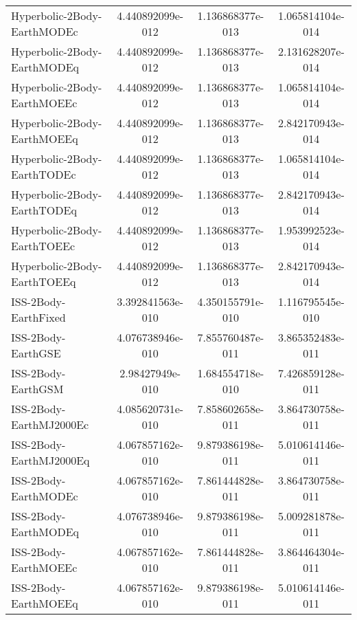 \begin{table}[htbp!]
\begin{tabular}{lccc}
         Hyperbolic-2Body-EarthMODEc & 4.440892099e-012 & 1.136868377e-013 & 1.065814104e-014 \\
         Hyperbolic-2Body-EarthMODEq & 4.440892099e-012 & 1.136868377e-013 & 2.131628207e-014 \\
         Hyperbolic-2Body-EarthMOEEc & 4.440892099e-012 & 1.136868377e-013 & 1.065814104e-014 \\
         Hyperbolic-2Body-EarthMOEEq & 4.440892099e-012 & 1.136868377e-013 & 2.842170943e-014 \\
         Hyperbolic-2Body-EarthTODEc & 4.440892099e-012 & 1.136868377e-013 & 1.065814104e-014 \\
         Hyperbolic-2Body-EarthTODEq & 4.440892099e-012 & 1.136868377e-013 & 2.842170943e-014 \\
         Hyperbolic-2Body-EarthTOEEc & 4.440892099e-012 & 1.136868377e-013 & 1.953992523e-014 \\
         Hyperbolic-2Body-EarthTOEEq & 4.440892099e-012 & 1.136868377e-013 & 2.842170943e-014 \\
         ISS-2Body-EarthFixed & 3.392841563e-010 & 4.350155791e-010 & 1.116795545e-010 \\
         ISS-2Body-EarthGSE & 4.076738946e-010 & 7.855760487e-011 & 3.865352483e-011 \\
         ISS-2Body-EarthGSM & 2.98427949e-010 & 1.684554718e-010 & 7.426859128e-011 \\
         ISS-2Body-EarthMJ2000Ec & 4.085620731e-010 & 7.858602658e-011 & 3.864730758e-011 \\
         ISS-2Body-EarthMJ2000Eq & 4.067857162e-010 & 9.879386198e-011 & 5.010614146e-011 \\
         ISS-2Body-EarthMODEc & 4.067857162e-010 & 7.861444828e-011 & 3.864730758e-011 \\
         ISS-2Body-EarthMODEq & 4.076738946e-010 & 9.879386198e-011 & 5.009281878e-011 \\
         ISS-2Body-EarthMOEEc & 4.067857162e-010 & 7.861444828e-011 & 3.864464304e-011 \\
         ISS-2Body-EarthMOEEq & 4.067857162e-010 & 9.879386198e-011 & 5.010614146e-011 \\

\end{tabular}
\end{table}
